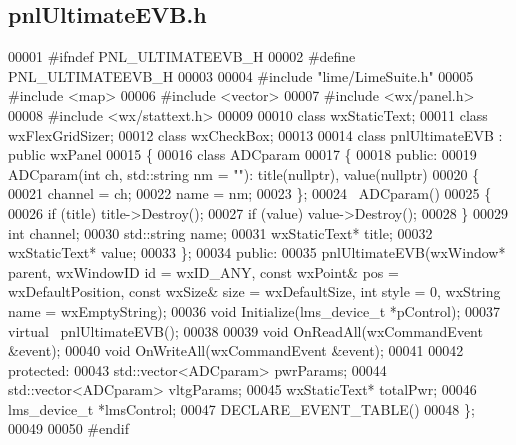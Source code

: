 \subsection{pnl\+Ultimate\+E\+V\+B.\+h}
\label{pnlUltimateEVB_8h_source}

\begin{DoxyCode}
00001 \textcolor{preprocessor}{#ifndef PNL\_ULTIMATEEVB\_H}
00002 \textcolor{preprocessor}{#define PNL\_ULTIMATEEVB\_H}
00003 
00004 \textcolor{preprocessor}{#include "lime/LimeSuite.h"}
00005 \textcolor{preprocessor}{#include <map>}
00006 \textcolor{preprocessor}{#include <vector>}
00007 \textcolor{preprocessor}{#include <wx/panel.h>}
00008 \textcolor{preprocessor}{#include <wx/stattext.h>}
00009 
00010 \textcolor{keyword}{class }wxStaticText;
00011 \textcolor{keyword}{class }wxFlexGridSizer;
00012 \textcolor{keyword}{class }wxCheckBox;
00013 
00014 \textcolor{keyword}{class }pnlUltimateEVB : \textcolor{keyword}{public} wxPanel
00015 \{
00016     \textcolor{keyword}{class }ADCparam
00017     \{
00018     \textcolor{keyword}{public}:
00019         ADCparam(\textcolor{keywordtype}{int} ch, std::string nm = \textcolor{stringliteral}{""}): title(nullptr), value(nullptr)
00020         \{
00021             channel = ch;
00022             name = nm;
00023         \};
00024         ~ADCparam()
00025         \{
00026             \textcolor{keywordflow}{if} (title) title->Destroy();
00027             \textcolor{keywordflow}{if} (value) value->Destroy();
00028         \}
00029         \textcolor{keywordtype}{int} channel;
00030         std::string name;
00031         wxStaticText* title;
00032         wxStaticText* value;
00033     \};
00034 \textcolor{keyword}{public}:
00035     pnlUltimateEVB(wxWindow* parent, wxWindowID \textcolor{keywordtype}{id} = wxID\_ANY, \textcolor{keyword}{const} wxPoint& pos = wxDefaultPosition, \textcolor{keyword}{
      const} wxSize& size = wxDefaultSize, \textcolor{keywordtype}{int} style = 0, wxString name = wxEmptyString);
00036     \textcolor{keywordtype}{void} Initialize(lms_device_t *pControl);
00037     \textcolor{keyword}{virtual} ~pnlUltimateEVB();
00038 
00039     \textcolor{keywordtype}{void} OnReadAll(wxCommandEvent &event);
00040     \textcolor{keywordtype}{void} OnWriteAll(wxCommandEvent &event);
00041 
00042 \textcolor{keyword}{protected}:
00043     std::vector<ADCparam> pwrParams;
00044     std::vector<ADCparam> vltgParams;
00045     wxStaticText* totalPwr;
00046     lms_device_t *lmsControl;
00047     DECLARE\_EVENT\_TABLE()
00048 \};
00049 
00050 \textcolor{preprocessor}{#endif}
\end{DoxyCode}
